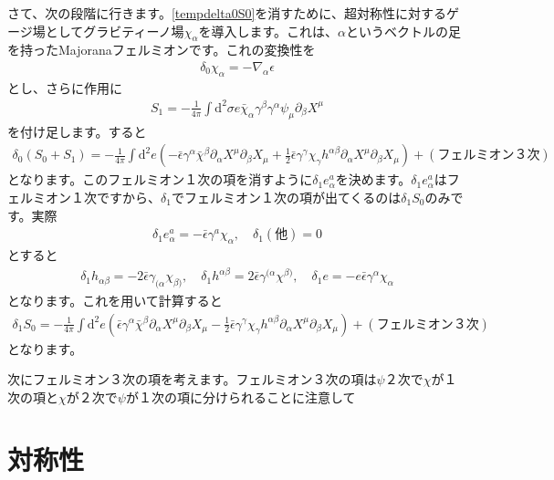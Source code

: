 \documentclass[report,paper=a4, fontsize=12pt, line_length=16cm, number_of_lines=33,dvipdfmx]{jlreq}
\numberwithin{equation}{chapter}
\numberwithin{equation}{section}
\newcommand{\del}{\partial}
\newcommand{\di}{\mathrm{d}}
\newcommand{\chib}{\bar{\chi}}
\newcommand{\epsilonb}{\bar{\epsilon}}
\begin{document}
さて、次の段階に行きます。\eqref{tempdelta0S0}を消すために、超対称性に対するゲージ場としてグラビティーノ場$\chi_{\alpha}$を導入します。これは、$\alpha$というベクトルの足を持ったMajoranaフェルミオンです。これの変換性を
\begin{align}
  \delta_{0}\chi_{\alpha}=-\nabla_{\alpha}\epsilon
\end{align}
とし、さらに作用に
\begin{align}
  S_1=-\frac{1}{4\pi}\int \di^2 \sigma e
  \chib_{\alpha}\gamma^{\beta}\gamma^{\alpha}\psi_{\mu}\del_{\beta}X^{\mu}
\end{align}
を付け足します。すると
\begin{align}
  \delta_{0}(S_0+S_1)=-\frac{1}{4\pi}\int \di^2 e\left(-\epsilonb \gamma^{\alpha}\chib^{\beta}\del_{\alpha}X^{\mu}\del_{\beta}X_{\mu}+\frac12\epsilonb \gamma^{\gamma}\chi_{\gamma}h^{\alpha\beta}\del_{\alpha}X^{\mu}\del_{\beta}X_{\mu}  \right)+(\text{フェルミオン３次})
\end{align}
となります。このフェルミオン１次の項を消すように$\delta_{1}e^{a}_{\alpha}$を決めます。$\delta_{1}e^{a}_{\alpha}$はフェルミオン１次ですから、$\delta_1$でフェルミオン１次の項が出てくるのは$\delta_1 S_0$のみです。実際
\begin{align}
  \delta_1 e^{a}_{\alpha}=-\epsilonb \gamma^{a}\chi_{\alpha},\quad
  \delta_1 (\text{他})=0
\end{align}
とすると
\begin{align}
  \delta_1 h_{\alpha\beta}=-2\epsilonb \gamma_{(\alpha}\chi_{\beta)},\quad
  \delta_1 h^{\alpha\beta}=2\epsilonb \gamma^{(\alpha}\chi^{\beta)},\quad
  \delta_1 e = -e \epsilonb \gamma^{\alpha}\chi_{\alpha}
\end{align}
となります。これを用いて計算すると
\begin{align}
  \delta_1 S_0=-\frac{1}{4\pi}\int \di^2 e\left(\epsilonb \gamma^{\alpha}\chib^{\beta}\del_{\alpha}X^{\mu}\del_{\beta}X_{\mu}-\frac12\epsilonb \gamma^{\gamma}\chi_{\gamma}h^{\alpha\beta}\del_{\alpha}X^{\mu}\del_{\beta}X_{\mu}  \right)+(\text{フェルミオン３次})
\end{align}
となります。

次にフェルミオン３次の項を考えます。フェルミオン３次の項は$\psi$２次で$\chi$が１次の項と$\chi$が２次で$\psi$が１次の項に分けられることに注意して
\section{対称性}
\end{document}
